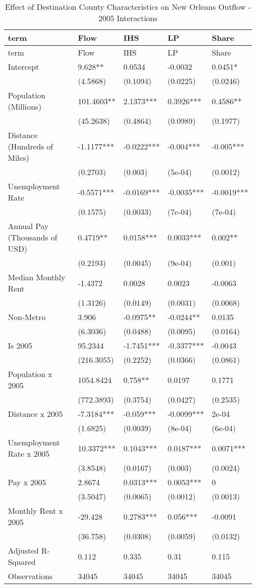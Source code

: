 \documentclass[]{article}
\begin{document}
\begin{longtable}[]{@{}lllll@{}}
\caption{\label{tab:reg2005}Effect of Destination County Characteristics
on New Orleans Outflow - 2005 Interactions}\tabularnewline
\toprule
term & Flow & IHS & LP & Share\tabularnewline
\midrule
\endfirsthead
\toprule
term & Flow & IHS & LP & Share\tabularnewline
\midrule
\endhead
Intercept & 9.628** & 0.0534 & -0.0032 & 0.0451*\tabularnewline
& (4.5868) & (0.1094) & (0.0225) & (0.0246)\tabularnewline
Population (Millions) & 101.4603** & 2.1373*** & 0.3926*** &
0.4586**\tabularnewline
& (45.2638) & (0.4864) & (0.0989) & (0.1977)\tabularnewline
Distance (Hundreds of Miles) & -1.1177*** & -0.0222*** & -0.004*** &
-0.005***\tabularnewline
& (0.2703) & (0.003) & (5e-04) & (0.0012)\tabularnewline
Unemployment Rate & -0.5571*** & -0.0169*** & -0.0035*** &
-0.0019***\tabularnewline
& (0.1575) & (0.0033) & (7e-04) & (7e-04)\tabularnewline
Annual Pay (Thousands of USD) & 0.4719** & 0.0158*** & 0.0033*** &
0.002**\tabularnewline
& (0.2193) & (0.0045) & (9e-04) & (0.001)\tabularnewline
Median Monthly Rent & -1.4372 & 0.0028 & 0.0023 & -0.0063\tabularnewline
& (1.3126) & (0.0149) & (0.0031) & (0.0068)\tabularnewline
Non-Metro & 3.906 & -0.0975** & -0.0244** & 0.0135\tabularnewline
& (6.3036) & (0.0488) & (0.0095) & (0.0164)\tabularnewline
Is 2005 & 95.2344 & -1.7451*** & -0.3377*** & -0.0043\tabularnewline
& (216.3055) & (0.2252) & (0.0366) & (0.0861)\tabularnewline
Population x 2005 & 1054.8424 & 0.758** & 0.0197 & 0.1771\tabularnewline
& (772.3893) & (0.3754) & (0.0427) & (0.2535)\tabularnewline
Distance x 2005 & -7.3184*** & -0.059*** & -0.0099*** &
2e-04\tabularnewline
& (1.6825) & (0.0039) & (8e-04) & (6e-04)\tabularnewline
Unemployment Rate x 2005 & 10.3372*** & 0.1043*** & 0.0187*** &
0.0071***\tabularnewline
& (3.8548) & (0.0167) & (0.003) & (0.0024)\tabularnewline
Pay x 2005 & 2.8674 & 0.0313*** & 0.0053*** & 0\tabularnewline
& (3.5047) & (0.0065) & (0.0012) & (0.0013)\tabularnewline
Monthly Rent x 2005 & -29.428 & 0.2783*** & 0.056*** &
-0.0091\tabularnewline
& (36.758) & (0.0308) & (0.0059) & (0.0132)\tabularnewline
Adjusted R-Squared & 0.112 & 0.335 & 0.31 & 0.115\tabularnewline
Observations & 34045 & 34045 & 34045 & 34045\tabularnewline
\bottomrule
\end{longtable}
\end{document}
